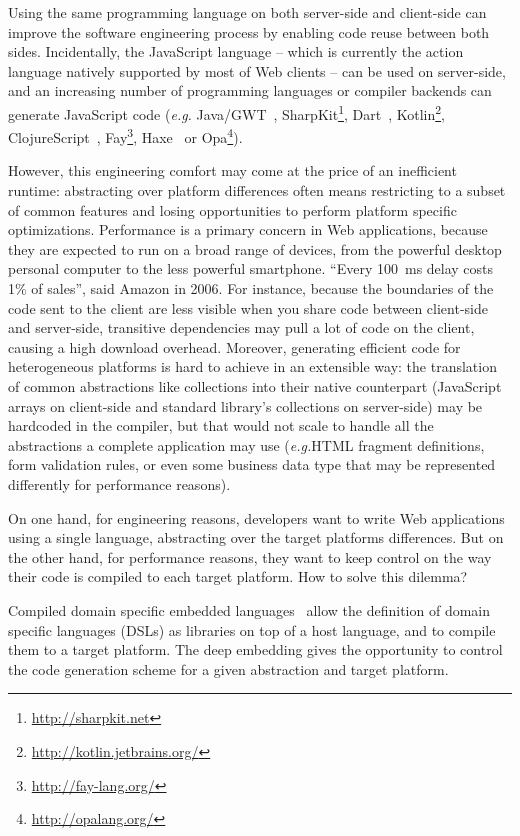 \documentclass[preprint]{sigplanconf}
\newcommand{\eg}{\emph{e.g.}}
\begin{document}
Using the same programming language on both server-side and client-side can improve the software engineering
process by enabling code reuse between both sides. Incidentally, the JavaScript language -- which is currently the
action language natively supported by most of Web clients -- can be used on server-side, and an increasing
number of programming languages or compiler backends can generate JavaScript code (\eg
Java/GWT~\cite{Chaganti07_GWT}, SharpKit\footnote{\href{http://sharpkit.net}{http://sharpkit.net}},
Dart~\cite{Griffith11_Dart}, Kotlin\footnote{\href{http://kotlin.jetbrains.org/}{http://kotlin.jetbrains.org/}},
ClojureScript~\cite{McGranaghan11_ClojureScript}, Fay\footnote{\href{http://fay-lang.org/}{http://fay-lang.org/}},
Haxe~\cite{Cannasse08_HaXe} or Opa\footnote{\href{http://opalang.org/}{http://opalang.org/}}).

However, this engineering comfort may come at the price of an inefficient runtime: abstracting over platform
differences often means restricting to a subset of common features and losing opportunities to perform platform
specific optimizations. Performance is a primary concern in Web applications, because they are expected to run on a
broad range of devices, from the powerful desktop personal computer to the less powerful smartphone. “Every 100~ms
delay costs 1\% of sales”, said Amazon in 2006. For instance, because the boundaries of the code sent to the client
are less visible when you share code between client-side and server-side, transitive dependencies may pull a lot of
code on the client, causing a high download overhead. Moreover, generating efficient code for heterogeneous platforms
is hard to achieve in an extensible way: the translation of common abstractions like collections into their native
counterpart (JavaScript arrays on client-side and standard library’s collections on server-side) may be hardcoded in
the compiler, but that would not scale to handle all the abstractions a complete application may use (\eg HTML
fragment definitions, form validation rules, or even some business data type that may be represented differently for
performance reasons).

On one hand, for engineering reasons, developers want to write Web applications using a single language, abstracting
over the target platforms differences. But on the other hand, for performance reasons, they want to keep
control on the way their code is compiled to each target platform. How to solve this dilemma?

Compiled domain specific embedded languages~\cite{Elliott2003_Compiling} allow the definition of domain specific
languages (DSLs) as libraries on top of a host language, and to compile them to a target platform. The deep embedding
gives the opportunity to control the code generation scheme for a given abstraction and target platform.
\end{document}
